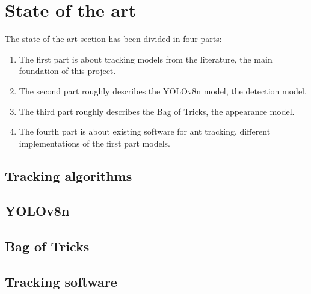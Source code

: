 
\section{State of the art}

{
    The state of the art section has been divided in four parts:
}

\begin{enumerate}
    \item The first part is about tracking models from the literature, the main foundation of this project.
    \item The second part roughly describes the YOLOv8n model, the detection model.
    \item The third part roughly describes the Bag of Tricks, the appearance model.
    \item The fourth part is about existing software for ant tracking, different implementations of the first part models.
\end{enumerate}

\needspace{0.25\textheight}
\subsection{Tracking algorithms}


\FloatBarrier

\needspace{0.25\textheight}
\subsection{YOLOv8n}


\FloatBarrier

\needspace{0.25\textheight}
\subsection{Bag of Tricks}



\needspace{0.25\textheight}
\subsection{Tracking software}


